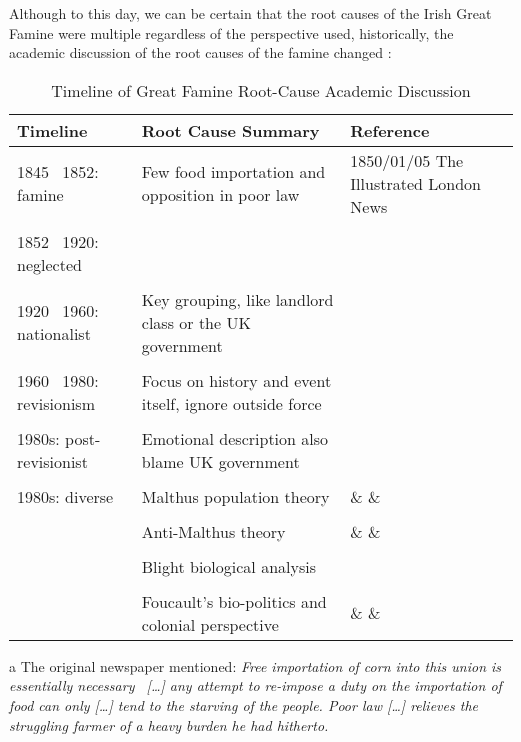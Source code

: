 Although to this day, we can be certain that the root causes of the Irish Great Famine were multiple regardless of the perspective used, 
historically, the academic discussion of the root causes of the famine changed \citep{henderson2005irish}:

\vspace{0pt}
\begin{table}[h]
    \centering
	\begin{threeparttable}
    \caption{Timeline of Great Famine Root-Cause Academic Discussion}
		\begin{tabular}{lp{5cm}p{5cm}}
			\toprule
			Timeline & Root Cause Summary & Reference \\
			\midrule
			1845 \textendash\ 1852: famine & Few food importation and opposition in poor law & 1850/01/05 The Illustrated London News\tnote{a} \\
			& & \\
			1852 \textendash\ 1920: neglected  & \textemdash\ \tnote{b} & \citep{kinealy2017great}\\
			& & \\
			1920 \textendash\ 1960: nationalist & Key grouping, like landlord class or the UK government & \citep{smith2005reckoning} \\
			& & \\
			1960 \textendash\ 1980: revisionism & Focus on history and event itself, ignore outside force & \citep{daly2006revisionism} \\
			& & \\
			1980s: post-revisionist & Emotional description also blame UK government & \citep{hamera2011outline} \\
			& & \\
			1980s: diverse & Malthus population theory & \citep{o2009food} \& \citep{mcgregor1989demographic} \& \citep{weir1991malthus} \\
			& &  \\
			& Anti-Malthus theory & \citep{o1983malthus} \& \citep{mokyr1980malthusian} \& \citep{guinnane1994great}\\
			& & \\
			& Blight biological analysis & \citep{donnelly2011irish}\\
			& & \\
			& Foucault's bio-politics and colonial perspective & \citep{nally2008coming} \& \citep{kennedy2020beckett} \& \citep{madden2016aids} \\
			\bottomrule
		\end{tabular}
		\begin{tablenotes}
			\item[a] The original newspaper mentioned: \textit{Free importation of corn into this union is essentially necessary \textendash\ [\ldots] any attempt to re-impose a duty on the importation of food can only [\ldots]  tend to the starving of the people. Poor law [\ldots] relieves the struggling farmer of a heavy burden he had hitherto.} \citep{1850_01_05_news}
			

\end{tablenotes}
\end{threeparttable}
\end{table}
